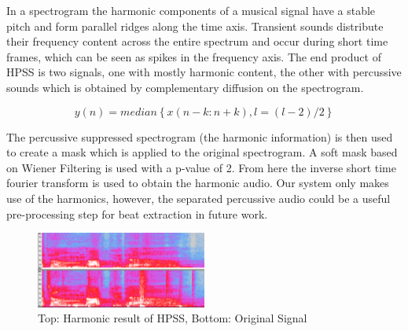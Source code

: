 \documentclass{article}
\begin{document}
In a spectrogram the harmonic components of a musical signal have  a stable
pitch and form parallel ridges along the time axis. Transient sounds distribute
their frequency content across the entire spectrum and occur during short time
frames, which can be seen as spikes in the frequency axis. The end product of
HPSS is two signals, one with mostly harmonic content, the other with
percussive sounds which is obtained by complementary diffusion on the
spectrogram.

$$ y(n) = median \left \{x(n-k:n+k),l = (l-2)/2  \right \} $$

The percussive suppressed spectrogram (the harmonic information) is then used
to create a mask which is applied to the original spectrogram. A soft mask
based on Wiener Filtering is used with a p-value of 2. From here the inverse
short time fourier transform is used to obtain the harmonic audio. Our system
only makes use of the harmonics, however, the  separated percussive audio could
be a useful pre-processing step for beat extraction in future work.

\begin{figure}
   \centering
    \includegraphics[width=0.5\textwidth]{hpssspec.png}
   \caption{Top: Harmonic result of HPSS, Bottom: Original Signal}
   \label{fig:HPSS}
\end{figure}
\end{document}
